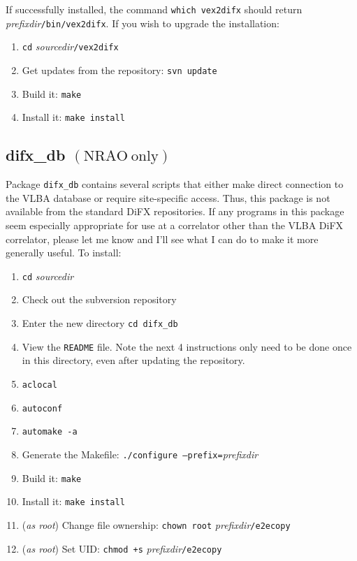 If successfully installed, the command {\tt which vex2difx} should return {\em prefixdir}{\tt /bin/vex2difx}.
If you wish to upgrade the installation:
\begin{enumerate}
\item {\tt cd} {\em sourcedir}{\tt /vex2difx}
\item Get updates from the repository: {\tt svn update}
\item Build it: {\tt make}
\item Install it: {\tt make install}
\end{enumerate}










\subsection{difx\_db {\small $\mathrm{(NRAO\ only)}$}}

\vspace{-20pt}\hspace{145pt}
\difxonefive

\vspace{7pt}

\noindent
Package {\tt difx\_db} contains several scripts that either make direct connection to the VLBA database or require site-specific access.
Thus, this package is not available from the standard DiFX repositories.
If any programs in this package seem especially appropriate for use at a correlator other than the VLBA DiFX correlator, please let me know and I'll see what I can do to make it more generally useful.
To install:
\begin{enumerate}
\item {\tt cd} {\em sourcedir}
\item Check out the subversion repository
\item Enter the new directory {\tt cd difx\_db}
\item View the {\tt README} file.  
Note the next 4 instructions only need to be done once in this directory, even after updating the repository.
\item {\tt aclocal}
\item {\tt autoconf}
\item {\tt automake -a}
\item Generate the Makefile: {\tt ./configure --prefix=}{\em prefixdir}
\item Build it: {\tt make}
\item Install it: {\tt make install}
\item ({\em as root}) Change file ownership: {\tt chown root} {\em prefixdir}{\tt /e2ecopy}
\item ({\em as root}) Set UID: {\tt chmod +s} {\em prefixdir}{\tt /e2ecopy}
\end{enumerate}

